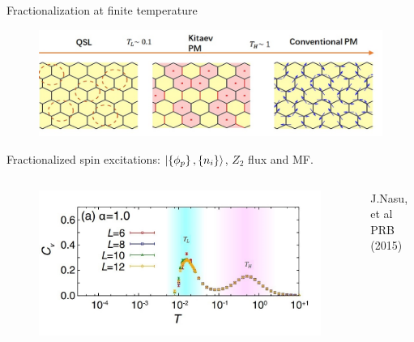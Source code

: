 \begin{frame}{Fractionalization at finite temperature}

    \begin{figure}
    \centering
        \begin{minipage}[t]{.85\textwidth}
            \includegraphics[width = 1\textwidth]{figures/TLTH.jpg}
        \end{minipage}
    \end{figure}
    
    Fractionalized spin excitations: $\ket{\left\{\phi_p\right\}, \left\{ n_i\right\}}$, $Z_2$ flux and MF.
    
    \begin{columns}[c]
    \begin{figure}[t]
        \centering
        \includegraphics[width = .75\textwidth]{figures/Cv2.jpg}
    \end{figure}
    
        \scriptsize J.Nasu, et al PRB (2015)
    \end{columns}
    
\end{frame}



